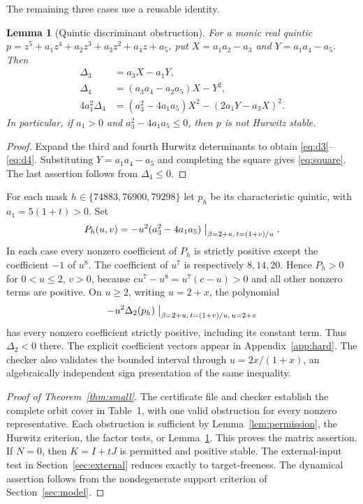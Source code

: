\documentclass[11pt,a4paper]{article}
\newtheorem{lemma}[theorem]{Lemma}
\theoremstyle{definition}\newtheorem{definition}[theorem]{Definition}
\theoremstyle{remark}\newtheorem{remark}[theorem]{Remark}
\begin{document}
The remaining three cases use a reusable identity.
\begin{lemma}[Quintic discriminant obstruction]\label{lem:quintic}
For a monic real quintic
$p=z^5+a_1z^4+a_2z^3+a_3z^2+a_4z+a_5$, put
$X=a_1a_2-a_3$ and $Y=a_1a_4-a_5$. Then
\begin{align}
 \Delta_3&=a_3X-a_1Y,\label{eq:d3}\\
 \Delta_4&=(a_3a_4-a_2a_5)X-Y^2,\label{eq:d4}\\
 4a_1^2\Delta_4&=(a_3^2-4a_1a_5)X^2-(2a_1Y-a_3X)^2.\label{eq:square}
\end{align}
In particular, if $a_1>0$ and $a_3^2-4a_1a_5\leq0$, then $p$ is not Hurwitz stable.
\end{lemma}
\begin{proof}
Expand the third and fourth Hurwitz determinants to obtain \eqref{eq:d3}--\eqref{eq:d4}. Substituting $Y=a_1a_4-a_5$ and completing the square gives \eqref{eq:square}. The last assertion follows from $\Delta_4\leq0$.
\end{proof}

For each mask $h\in\{74883,76900,79298\}$ let $p_h$ be its characteristic quintic, with $a_1=5(1+t)>0$. Set
\[
 P_h(u,v)=-u^2(a_3^2-4a_1a_5)\bigm|_{\beta=2+u,\,t=(1+v)/u}.
\]
In each case every nonzero coefficient of $P_h$ is strictly positive except the coefficient $-1$ of $u^8$. The coefficient of $u^7$ is respectively $8,14,20$. Hence $P_h>0$ for $0<u\leq2$, $v>0$, because $c u^7-u^8=u^7(c-u)>0$ and all other nonzero terms are positive. On $u\geq2$, writing $u=2+x$, the polynomial
\[
 -u^2\Delta_2(p_h)\bigm|_{\beta=2+u,\,t=(1+v)/u,\,u=2+x}
\]
has every nonzero coefficient strictly positive, including its constant term. Thus $\Delta_2<0$ there. The explicit coefficient vectors appear in Appendix~\ref{app:hard}. The checker also validates the bounded interval through $u=2x/(1+x)$, an algebraically independent sign presentation of the same inequality.

\begin{proof}[Proof of Theorem~\ref{thm:small}]
The certificate file and checker establish the complete orbit cover in Table~1, with one valid obstruction for every nonzero representative. Each obstruction is sufficient by Lemma~\ref{lem:permission}, the Hurwitz criterion, the factor tests, or Lemma~\ref{lem:quintic}. This proves the matrix assertion. If $N=0$, then $K=I+tJ$ is permitted and positive stable. The external-input test in Section~\ref{sec:external} reduces exactly to target-freeness. The dynamical assertion follows from the nondegenerate support criterion of Section~\ref{sec:model}.
\end{proof}
\end{document}
